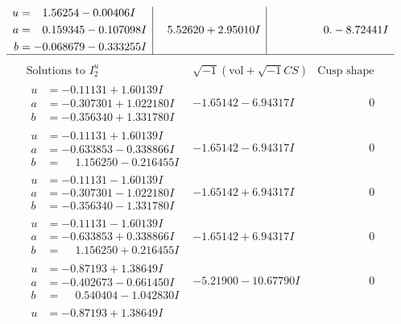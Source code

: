\documentclass[1p]{elsarticle_modified}
\theoremstyle{definition}
\newcommand{\I}{\sqrt{-1}}
\begin{document}
$$\begin{array}{c|c|c}
\begin{aligned}
u &= \phantom{-}1.56254 - 0.00406 I \\
a &= \phantom{-}0.159345 - 0.107098 I \\
b &= -0.068679 - 0.333255 I\end{aligned}
 & \phantom{-}5.52620 + 2.95010 I & \phantom{-0.000000 } 0. - 8.72441 I\\
 \hline 
 \end{array}$$\newpage$$\begin{array}{c|c|c}  
\text{Solutions to }I^u_{2}& \I (\text{vol} + \sqrt{-1}CS) & \text{Cusp shape}\\
 \hline 
\begin{aligned}
u &= -0.11131 + 1.60139 I \\
a &= -0.307301 + 1.022180 I \\
b &= -0.356340 + 1.331780 I\end{aligned}
 & -1.65142 - 6.94317 I & \phantom{-0.000000 } 0 \\ \hline\begin{aligned}
u &= -0.11131 + 1.60139 I \\
a &= -0.633853 - 0.338866 I \\
b &= \phantom{-}1.156250 - 0.216455 I\end{aligned}
 & -1.65142 - 6.94317 I & \phantom{-0.000000 } 0 \\ \hline\begin{aligned}
u &= -0.11131 - 1.60139 I \\
a &= -0.307301 - 1.022180 I \\
b &= -0.356340 - 1.331780 I\end{aligned}
 & -1.65142 + 6.94317 I & \phantom{-0.000000 } 0 \\ \hline\begin{aligned}
u &= -0.11131 - 1.60139 I \\
a &= -0.633853 + 0.338866 I \\
b &= \phantom{-}1.156250 + 0.216455 I\end{aligned}
 & -1.65142 + 6.94317 I & \phantom{-0.000000 } 0 \\ \hline\begin{aligned}
u &= -0.87193 + 1.38649 I \\
a &= -0.402673 - 0.661450 I \\
b &= \phantom{-}0.540404 - 1.042830 I\end{aligned}
 & -5.21900 - 10.67790 I & \phantom{-0.000000 } 0 \\ \hline\begin{aligned}
u &= -0.87193 + 1.38649 I \\

\end{aligned}
\end{array}$$
\end{document}
